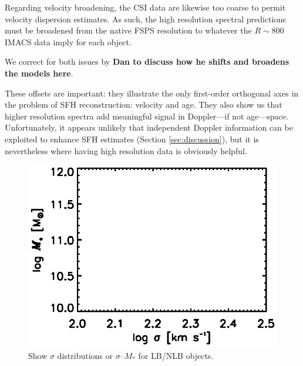 \documentclass[a4paper,fleqn,usenatbib]{mnras}
\newcommand{\Mstel}{M_\ast}
\newcommand{\bfr}{\bf\color{red}}
\newcommand{\bfb}{\color{myblue}}
\begin{document}
Regarding velocity broadening, the CSI data are likewise too coarse to permit velocity
dispersion estimates. As such, the high resolution spectral predictions
must be broadened from the native FSPS resolution to whatever the $R\sim800$ IMACS data imply
for each object. 

We correct for both issues by {\bfr Dan to discuss how he shifts and broadens the models here}.

These offsets are important: they illustrate the only first-order orthogonal axes in the problem of SFH 
reconstruction: velocity and age. They also show us that higher resolution spectra add meaningful 
signal in Doppler---if not age---space. Unfortunately, it appears unlikely that independent Doppler
information can be exploited to enhance SFH estimates (Section \ref{sec:discussion}), but it
is nevertheless where having high resolution data is obviously helpful.

\begin{figure}
\centering
\includegraphics[scale = 0.9, trim = 1cm 0cm 0cm 0cm]{disp}
\caption{\bfb Show $\sigma$ distributions or $\sigma$--$\Mstel$ for LB/NLB objects.}
\label{fig:disp}
\end{figure}
\end{document}
